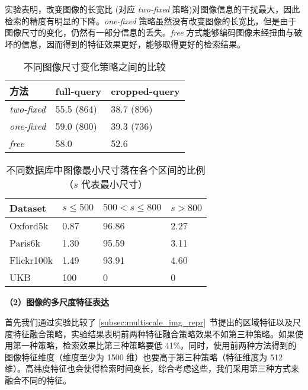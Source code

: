 实验表明，改变图像的长宽比 (对应 \emph{two-fixed} 策略)对图像信息的干扰最大，因此检索的精度有明显的下降。\emph{one-fixed} 策略虽然没有改变图像的长宽比，但是由于图像尺寸的变化，仍然有一部分信息的丢失。\emph{free} 方式能够编码图像未经扭曲与破坏的信息，因而得到的特征效果更好，能够取得更好的检索结果。

\begin{table}[!t]
	\centering
	\caption{不同图像尺寸变化策略之间的比较}
	\label{table:image_size_impact}
	\begin{tabular}{lll}
		\toprule
		方法		    & full-query			& cropped-query \\
		\midrule
		\emph{two-fixed}		&		55.5 (864)		& 	38.7 (896)	\\
		\emph{one-fixed}		&		59.0 (800) 		&	39.3 (736)\\
		\emph{free}				&		58.0	 		&	52.6 	\\
		\bottomrule
	\end{tabular}
\end{table}

\begin{table}[!t]
	\centering
	\caption[不同数据库中图像最小尺寸落在各个区间的比例]{不同数据库中图像最小尺寸落在各个区间的比例（$s$ 代表最小尺寸）}
	\label{table:min_size_distribution}
	\begin{tabular}{llll}
		\toprule
		Dataset & $s\leq 500$ & $500< s \leq 800$&  $s>800$ \\
		\midrule
		Oxford5k & 0.87 & 96.86 & 2.27 \\
		Paris6k & 1.30  & 95.59 & 3.11 \\
		Flickr100k & 1.49 & 93.91 & 4.60\\
		UKB & 100 & 0 & 0 \\
		\bottomrule
	\end{tabular}
	\end{table}

\noindent\textbf{（2）图像的多尺度特征表达}

首先我们通过实验比较了 \ref{subsec:multiscale_img_repr}~节提出的区域特征以及尺度特征融合策略，实验结果表明前两种特征融合策略效果不如第三种策略。如果使用第一种策略，检索效果比第三种策略要低 41\%。同时，使用前两种方法得到的图像特征维度（维度至少为 1500 维）也要高于第三种策略（特征维度为 512 维）。高纬度特征也会使得检索时间变长，综合考虑这些，我们采用第三种方式来融合不同的特征。


